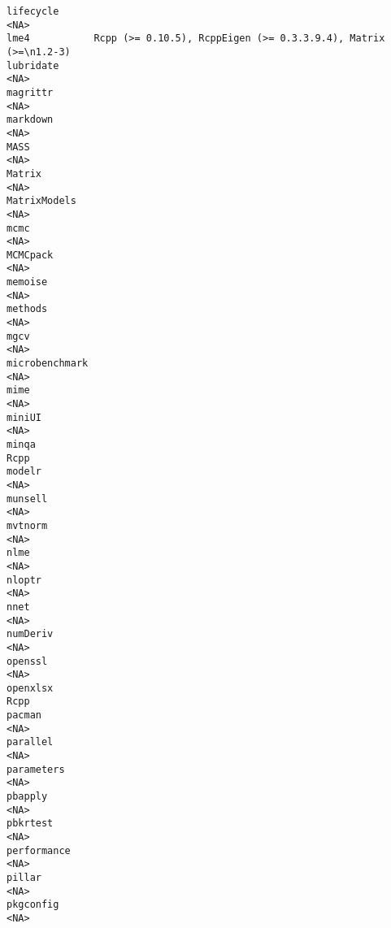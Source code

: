 \documentclass[
  letterpaper,
  DIV=11,
  numbers=noendperiod]{scrreprt}
\begin{document}
\begin{verbatim}
lifecycle                                                                <NA>
lme4           Rcpp (>= 0.10.5), RcppEigen (>= 0.3.3.9.4), Matrix (>=\n1.2-3)
lubridate                                                                <NA>
magrittr                                                                 <NA>
markdown                                                                 <NA>
MASS                                                                     <NA>
Matrix                                                                   <NA>
MatrixModels                                                             <NA>
mcmc                                                                     <NA>
MCMCpack                                                                 <NA>
memoise                                                                  <NA>
methods                                                                  <NA>
mgcv                                                                     <NA>
microbenchmark                                                           <NA>
mime                                                                     <NA>
miniUI                                                                   <NA>
minqa                                                                    Rcpp
modelr                                                                   <NA>
munsell                                                                  <NA>
mvtnorm                                                                  <NA>
nlme                                                                     <NA>
nloptr                                                                   <NA>
nnet                                                                     <NA>
numDeriv                                                                 <NA>
openssl                                                                  <NA>
openxlsx                                                                 Rcpp
pacman                                                                   <NA>
parallel                                                                 <NA>
parameters                                                               <NA>
pbapply                                                                  <NA>
pbkrtest                                                                 <NA>
performance                                                              <NA>
pillar                                                                   <NA>
pkgconfig                                                                <NA>

\end{verbatim}
\end{document}
